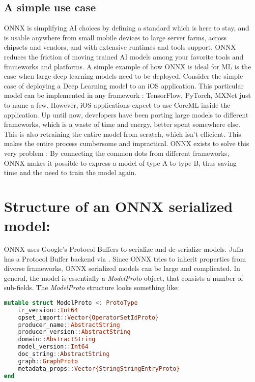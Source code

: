 \documentclass{juliacon}
\begin{document}
\subsection{A simple use case}
ONNX is simplifying AI choices by defining a standard which is here to stay, and is usable anywhere from small mobile devices to large server farms, across chipsets and vendors, and with extensive runtimes and tools support. ONNX reduces the friction of moving trained AI models among your favorite tools and frameworks and platforms. A simple example of how ONNX is ideal for ML is the case when large deep learning models need to be deployed. \newline \newline \newline Consider the simple case of deploying a Deep Learning model to an iOS application. This particular model can be implemented in any framework : TensorFlow, PyTorch, MXNet just to name a few. However, iOS applications expect to use CoreML inside the application. Up until now, developers have been porting large models to different frameworks, which is a waste of time and energy, better spent somewhere else. This is also retraining the entire model from scratch, which isn't efficient. This makes the entire process cumbersome and impractical. ONNX exists to solve this very problem : By connecting the common dots from different frameworks, ONNX makes it possible to express a model of type A to type B, thus saving time and the need to train the model again.

\section{Structure of an ONNX serialized model:}
ONNX uses Google's Protocol Buffers to serialize and de-serialize models. Julia has a Protocol Buffer backend via . \newline
Since ONNX tries to inherit properties from diverse frameworks, ONNX serialized models can be large and complicated. In general, the model is essentially a \textit{ModelProto} object, that consists a number of sub-fields. The \textit{ModelProto} structure looks something like:

\begin{lstlisting}[language=julia]
mutable struct ModelProto <: ProtoType
    ir_version::Int64
    opset_import::Vector{OperatorSetIdProto}
    producer_name::AbstractString
    producer_version::AbstractString
    domain::AbstractString
    model_version::Int64
    doc_string::AbstractString
    graph::GraphProto
    metadata_props::Vector{StringStringEntryProto}
end
\end{lstlisting}{}
\end{document}
